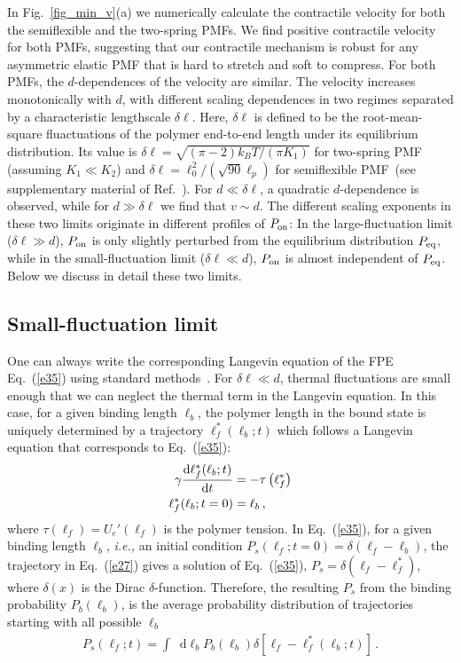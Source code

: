 \documentclass[twocolumn,prl,english]{revtex4-1}
\newcommand*\diff{\mathop{}\!\mathrm{d}}
\begin{document}
In Fig.~\ref{fig_min_v}(a) we numerically calculate the contractile velocity for both the semiflexible and the two-spring PMFs. We find positive contractile velocity for both PMFs, suggesting that our contractile mechanism is robust for any asymmetric elastic PMF that is hard to stretch and soft to compress. For both PMFs, the $d$-dependences of the velocity are similar. The velocity increases monotonically with $d$, with different scaling dependences in two regimes separated by a characteristic lengthscale $\delta \ell$. Here, $\delta \ell$ is defined to be the root-mean-square fluactuations of the polymer end-to-end  length under its equilibrium distribution. Its value is $\delta \ell=\sqrt{(\pi-2)k_B T/(\pi K_1)}$ for two-spring PMF (assuming $K_1\ll K_2$) and $\delta \ell =\ell_0^2/(\sqrt{90}\ell_p)$ for semiflexible PMF~(see supplementary material of Ref.~\cite{Chen2020}).  For $d\ll \delta \ell$, a quadratic $d$-dependence is observed, while for $d\gg\delta \ell$ we find that $v\sim d$. The different scaling exponents in these two limits originate in different profiles of $P_{\rm on}$: In the large-fluctuation limit ($\delta \ell\gg d$), $P_{\rm on}$ is only slightly perturbed from the equilibrium distribution $P_{\rm eq}$, while in the small-fluctuation limit ($ \delta \ell \ll d$), $P_{\rm on}$ is almost independent of $P_{\rm eq}$. Below we discuss in detail these two limits. 

\subsection{Small-fluctuation limit}
\label{s2a}
One can always write the corresponding Langevin equation of the FPE Eq.~(\ref{e35}) using standard methods~\cite{Gardiner}. For $\delta \ell \ll d$, thermal fluctuations are small enough that we can neglect the thermal term in the Langevin equation. In this case, for a given binding length $\ell_b$, the polymer length in the bound state is uniquely determined by a trajectory $\ell_f^*(\ell_b;t)$ which follows a  Langevin equation that corresponds to Eq.~(\ref{e35}):
\begin{align}
\gamma \frac{\diff{\ell}_f^*(\ell_b;t)}{\diff t} &= -\tau\left(\ell_f^*\right)\notag\\
{\ell}_f^*(\ell_b;t=0)&=\ell_b\, ,\label{e27}
\end{align}
where $\tau (\ell_f)=U_e'(\ell_f)$ is the polymer tension.  In Eq.~(\ref{e35}), for a given binding length $\ell_b$, {\it i.e.,} an initial condition $P_s(\ell_f;t=0 ) = \delta (\ell_f-\ell_b)$, the trajectory in Eq.~(\ref{e27}) gives a solution of Eq.~(\ref{e35}), $P_s = \delta(\ell_f-\ell_f^*)$, where $\delta(x)$ is the Dirac $\delta$-function. Therefore, the resulting $P_s$ from the binding probability $P_b(\ell_b)$, is the average probability distribution of trajectories starting with all possible $\ell_b$
\begin{align}
P_s(\ell_f;t) =\int \diff \ell_bP_b(\ell_b) \delta\left[\ell_f-\ell_f^*(\ell_b;t)\right]\, .\label{e28}
\end{align}
\end{document}
